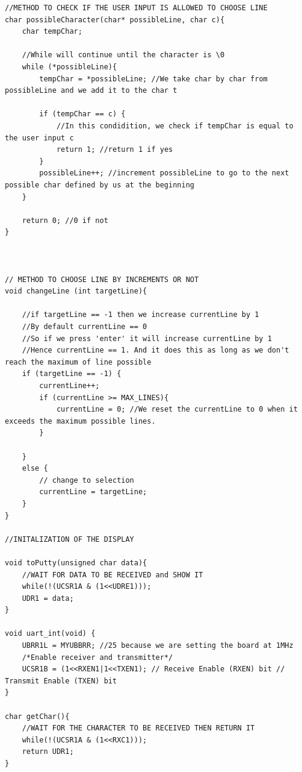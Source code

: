 \documentclass[a4paper,12pt]{article}
\begin{document}
\begin{lstlisting}[style=CStyle]
//METHOD TO CHECK IF THE USER INPUT IS ALLOWED TO CHOOSE LINE
char possibleCharacter(char* possibleLine, char c){
    char tempChar;
    
    //While will continue until the character is \0
    while (*possibleLine){
        tempChar = *possibleLine; //We take char by char from possibleLine and we add it to the char t
        
        if (tempChar == c) {
            //In this condidition, we check if tempChar is equal to the user input c
            return 1; //return 1 if yes
        }
        possibleLine++; //increment possibleLine to go to the next possible char defined by us at the beginning
    }

    return 0; //0 if not
}



// METHOD TO CHOOSE LINE BY INCREMENTS OR NOT
void changeLine (int targetLine){
    
    //if targetLine == -1 then we increase currentLine by 1
    //By default currentLine == 0
    //So if we press 'enter' it will increase currentLine by 1
    //Hence currentLine == 1. And it does this as long as we don't reach the maximum of line possible
    if (targetLine == -1) {
        currentLine++;
        if (currentLine >= MAX_LINES){
            currentLine = 0; //We reset the currentLine to 0 when it exceeds the maximum possible lines.
        }
        
    }
    else {
        // change to selection
        currentLine = targetLine;
    }
}

//INITALIZATION OF THE DISPLAY

void toPutty(unsigned char data){
    //WAIT FOR DATA TO BE RECEIVED and SHOW IT
    while(!(UCSR1A & (1<<UDRE1)));
    UDR1 = data;
}

void uart_int(void) {
    UBRR1L = MYUBBRR; //25 because we are setting the board at 1MHz
    /*Enable receiver and transmitter*/
    UCSR1B = (1<<RXEN1|1<<TXEN1); // Receive Enable (RXEN) bit // Transmit Enable (TXEN) bit
}

char getChar(){
    //WAIT FOR THE CHARACTER TO BE RECEIVED THEN RETURN IT
    while(!(UCSR1A & (1<<RXC1)));
    return UDR1;
}




\end{lstlisting}
\end{document}

